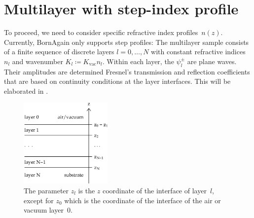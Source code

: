 \section{Multilayer with step-index profile}\label{SStep}

To proceed, we need to consider specific refractive index profiles~$n(z)$.
Currently, BornAgain only supports step profiles:
The multilayer sample consists of a finite sequence of discrete layers
$l=0,\ldots,N$
with constant refractive indices $n_l$
%
%
and wavenumber $K_l\coloneqq K_\text{vac} n_l$.
Within each layer, the $\psi^\pm_l$ are plane waves.
Their amplitudes are determined
 Fresnel's transmission and reflection coefficients
%
that are based on continuity conditions at the layer interfaces.
This will be elaborated in .
%
%

\begin{figure}[tb]
\begin{center}
\includegraphics[width=0.4\textwidth]{fig/drawing/multilayer_z_conventions.ps}
\end{center}
\caption{The parameter $z_l$ is the $z$ coordinate of the  interface
%
%
%
%
of layer~$l$, except for $z_0$ which is the coordinate of the  interface
of the air or vacuum layer~0.}
\label{Fdefz}
\end{figure}


